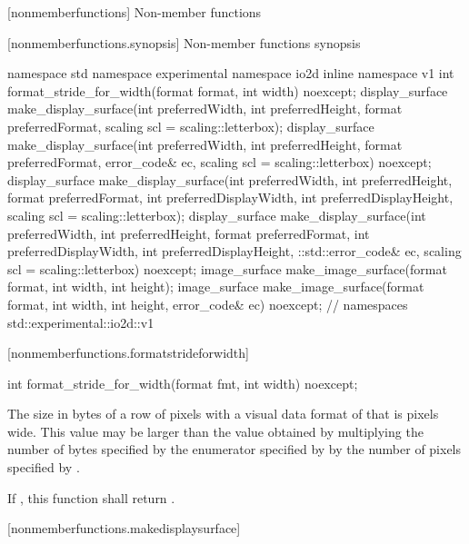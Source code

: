  [nonmemberfunctions] {Non-member functions}

 [nonmemberfunctions.synopsis] {Non-member functions synopsis}

\begin{codeblock}
namespace std { namespace experimental { namespace io2d { inline namespace v1 {
  int format_stride_for_width(format format, int width) noexcept;
  display_surface make_display_surface(int preferredWidth,
    int preferredHeight, format preferredFormat,
    scaling scl = scaling::letterbox);
  display_surface make_display_surface(int preferredWidth,
    int preferredHeight, format preferredFormat, error_code& ec,
    scaling scl = scaling::letterbox) noexcept;
  display_surface make_display_surface(int preferredWidth,
    int preferredHeight, format preferredFormat, int preferredDisplayWidth, 
    int preferredDisplayHeight, scaling scl = scaling::letterbox);
  display_surface make_display_surface(int preferredWidth,
    int preferredHeight, format preferredFormat, int preferredDisplayWidth, 
    int preferredDisplayHeight, ::std::error_code& ec,
    scaling scl = scaling::letterbox) noexcept;
  image_surface make_image_surface(format format, int width, int height);
  image_surface make_image_surface(format format, int width, int height, 
    error_code& ec) noexcept;
} } } } // namespaces std::experimental::io2d::v1
\end{codeblock}

 [nonmemberfunctions.formatstrideforwidth] {}

\begin{itemdecl}
int format_stride_for_width(format fmt, int width) noexcept;
\end{itemdecl}
\begin{itemdescr}
\pnum
\returns
The size in bytes of a row of pixels with a visual data format of  that is  pixels wide. This value may be larger than the value obtained by multiplying the number of bytes specified by the  enumerator specified by  by the number of pixels specified by .

\pnum
If , this function shall return .
\end{itemdescr}

 [nonmemberfunctions.makedisplaysurface] {}

